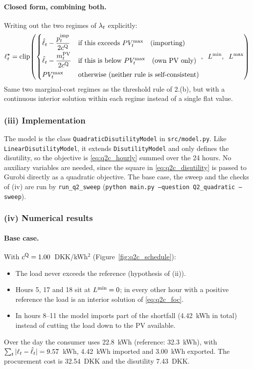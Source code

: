 \paragraph{Closed form, combining both.} Writing out the two regimes of $\lambda_{t}$ explicitly:
\begin{equation}
    \ell_{t}^\star = \mathrm{clip}\!\left(
    \begin{cases}
        \hat{\ell}_{t} - \dfrac{p^{\mathrm{imp}}_{t}}{2c^{\mathrm{Q}}} & \text{if this exceeds } PV_{t}^{\max} \quad (\text{importing}) \\[6pt]
        \hat{\ell}_{t} - \dfrac{m^{\mathrm{PV}}_{t}}{2c^{\mathrm{Q}}} & \text{if this is below } PV_{t}^{\max} \quad (\text{own PV only}) \\[6pt]
        PV_{t}^{\max} & \text{otherwise (neither rule is self-consistent)}
    \end{cases}, \;\; L^{\min}, \;\; L^{\max} \right)
    \label{eq:q2c_closed_form}
\end{equation}
Same two marginal-cost regimes as the threshold rule of 2.(b), but with a continuous interior solution within each regime instead of a single flat value.

\subsubsection{(iii) Implementation}
The model is the class \texttt{QuadraticDisutilityModel} in \texttt{src/model.py}. Like \texttt{LinearDisutilityModel}, it extends \texttt{DisutilityModel} and only defines the disutility, so the objective is \eqref{eq:q2c_hourly} summed over the 24 hours. No auxiliary variables are needed, since the square in \eqref{eq:q2c_disutility} is passed to Gurobi directly as a quadratic objective. The base case, the sweep and the checks of (iv) are run by \texttt{run\_q2\_sweep} (\texttt{python main.py --question Q2\_quadratic --sweep}).

\subsubsection{(iv) Numerical results}

\paragraph{Base case.} With $c^{\mathrm{Q}} = 1.00$~DKK/kWh$^2$ (Figure~\ref{fig:q2c_schedule}):
\begin{itemize}
    \item The load never exceeds the reference (hypothesis of (ii)).
    \item Hours 5, 17 and 18 sit at $L^{\min} = 0$; in every other hour with a positive reference the
    load is an interior solution of \eqref{eq:q2c_foc}.
    \item In hours 8--11 the model imports part of the shortfall (4.42~kWh in total) instead of
    cutting the load down to the PV available.
\end{itemize}
Over the day the consumer uses 22.8~kWh (reference: 32.3~kWh), with $\sum_t|\ell_{t}-\hat{\ell}_{t}| =
9.57$~kWh, 4.42~kWh imported and 3.00~kWh exported. The procurement cost is 32.54~DKK and the
disutility 7.43~DKK.

